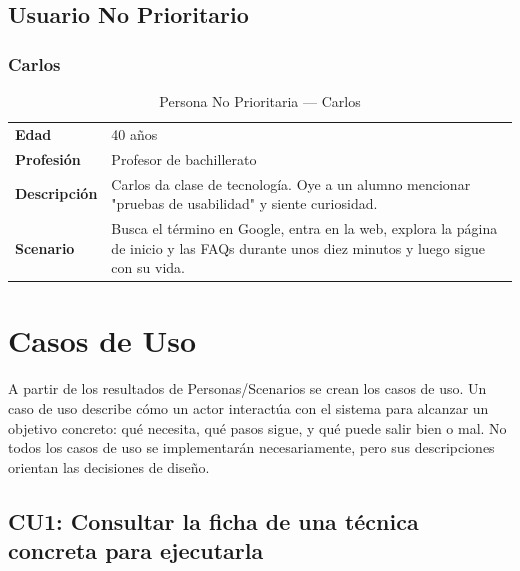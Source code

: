 \documentclass[12pt, a4paper]{report}
\begin{document}
\subsection{Usuario No Prioritario}

\subsubsection{Carlos}

\begin{table}[H]
\centering
\begin{tabularx}{\linewidth}{lX}
\toprule
\textbf{Edad} & 40 años \\
\textbf{Profesión} & Profesor de bachillerato \\
\midrule
\textbf{Descripción} & Carlos da clase de tecnología. Oye a un alumno mencionar "pruebas de usabilidad" y siente curiosidad. \\[4pt]
\textbf{Scenario} & Busca el término en Google, entra en la web, explora la página de inicio y las FAQs durante unos diez minutos y luego sigue con su vida. \\
\bottomrule
\end{tabularx}
\caption{Persona No Prioritaria — Carlos}
\end{table}

\section{Casos de Uso}

A partir de los resultados de Personas/Scenarios se crean los casos de uso. Un caso de uso
describe cómo un actor interactúa con el sistema para alcanzar un objetivo concreto: qué
necesita, qué pasos sigue, y qué puede salir bien o mal. No todos los casos de uso se
implementarán necesariamente, pero sus descripciones orientan las decisiones de diseño.

\subsection{CU1: Consultar la ficha de una técnica concreta para ejecutarla}
\end{document}
